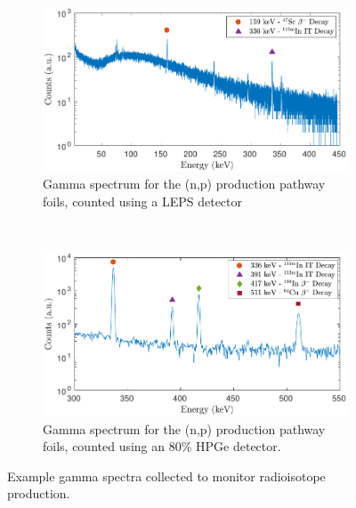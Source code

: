 \documentclass[5p]{elsarticle}
\begin{document}
\begin{figure}[ht]
    \centering
    \begin{subfigure}[t]{\textwidth}
        \centering
        \includegraphics[width=5in]{./figures/47sc_gspectrum_alt.pdf}
        \caption{ Gamma spectrum for the (n,p) production pathway foils, counted using a LEPS detector}
        \label{fig:spectra_a}
    \end{subfigure}%
    \\
    \begin{subfigure}[t]{\textwidth}
        \centering
        \includegraphics[width=5in]{./figures/64Cu_gspectrum_alt.pdf}
        \caption{Gamma spectrum for the (n,p) production pathway foils, counted using an 80\% HPGe detector.}
                \label{fig:spectra_b}
    \end{subfigure}
    \caption{Example gamma spectra collected to monitor radioisotope production.}
     \label{fig:main_spectra}
\end{figure}
\end{document}
